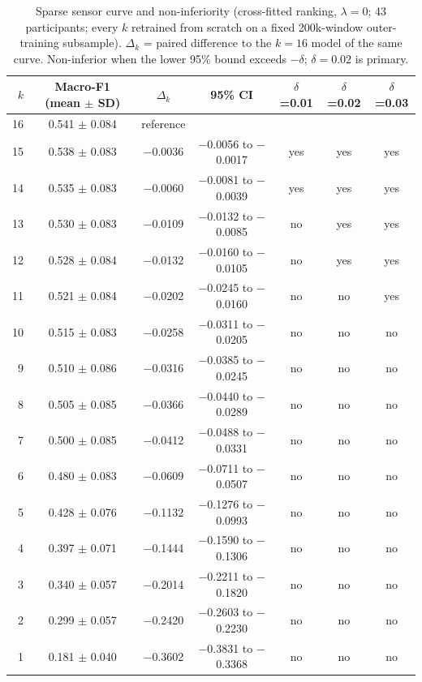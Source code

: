 \begin{table}[t]
\centering
\small
\caption{Sparse sensor curve and non-inferiority (cross-fitted ranking, $\lambda = 0$; 43 participants; every $k$ retrained from scratch on a fixed 200k-window outer-training subsample). $\Delta_k$ = paired difference to the $k = 16$ model of the same curve. Non-inferior when the lower 95\% bound exceeds $-\delta$; $\delta = 0.02$ is primary.}
\label{tab:sparse_ni}
\begin{tabular}{rcccccc}
\toprule
$k$ & Macro-F1 (mean $\pm$ SD) & $\Delta_k$ & 95\% CI & $\delta$=0.01 & $\delta$=0.02 & $\delta$=0.03 \\
\midrule
16 & 0.541 $\pm$ 0.084 & reference &  &  &  &  \\
15 & 0.538 $\pm$ 0.083 & $-$0.0036 & $-$0.0056 to $-$0.0017 & yes & yes & yes \\
14 & 0.535 $\pm$ 0.083 & $-$0.0060 & $-$0.0081 to $-$0.0039 & yes & yes & yes \\
13 & 0.530 $\pm$ 0.083 & $-$0.0109 & $-$0.0132 to $-$0.0085 & no & yes & yes \\
12 & 0.528 $\pm$ 0.084 & $-$0.0132 & $-$0.0160 to $-$0.0105 & no & yes & yes \\
11 & 0.521 $\pm$ 0.084 & $-$0.0202 & $-$0.0245 to $-$0.0160 & no & no & yes \\
10 & 0.515 $\pm$ 0.083 & $-$0.0258 & $-$0.0311 to $-$0.0205 & no & no & no \\
9 & 0.510 $\pm$ 0.086 & $-$0.0316 & $-$0.0385 to $-$0.0245 & no & no & no \\
8 & 0.505 $\pm$ 0.085 & $-$0.0366 & $-$0.0440 to $-$0.0289 & no & no & no \\
7 & 0.500 $\pm$ 0.085 & $-$0.0412 & $-$0.0488 to $-$0.0331 & no & no & no \\
6 & 0.480 $\pm$ 0.083 & $-$0.0609 & $-$0.0711 to $-$0.0507 & no & no & no \\
5 & 0.428 $\pm$ 0.076 & $-$0.1132 & $-$0.1276 to $-$0.0993 & no & no & no \\
4 & 0.397 $\pm$ 0.071 & $-$0.1444 & $-$0.1590 to $-$0.1306 & no & no & no \\
3 & 0.340 $\pm$ 0.057 & $-$0.2014 & $-$0.2211 to $-$0.1820 & no & no & no \\
2 & 0.299 $\pm$ 0.057 & $-$0.2420 & $-$0.2603 to $-$0.2230 & no & no & no \\
1 & 0.181 $\pm$ 0.040 & $-$0.3602 & $-$0.3831 to $-$0.3368 & no & no & no \\
\bottomrule
\end{tabular}
\end{table}
